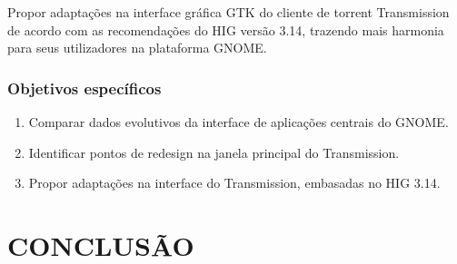 \documentclass[
    12pt,               %
    openright,          %
    oneside,            %
    a4paper,            %
    chapter=TITLE,      %
    section=TITLE,      %
    brazil              %
]{abntex2}
\begin{document}
Propor adaptações na interface gráfica GTK do cliente de torrent Transmission de
acordo com as recomendações do HIG versão 3.14, trazendo mais harmonia para seus
utilizadores na plataforma GNOME.

\subsection{Objetivos específicos}

\begin{enumerate}
  \item Comparar dados evolutivos da interface de aplicações centrais do GNOME.
  \item Identificar pontos de redesign na janela principal do Transmission.
  \item Propor adaptações na interface do Transmission, embasadas no HIG 3.14.
\end{enumerate}







\chapter{CONCLUSÃO}



\label{nropaginas}

\printindex
\end{document}
